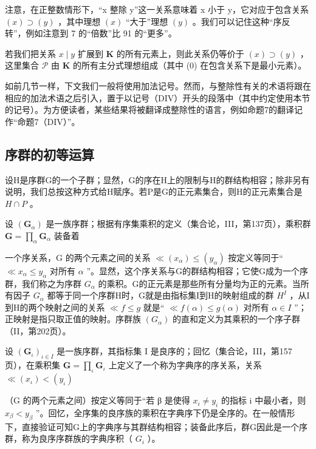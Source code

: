注意，在正整数情形下，“x 整除 y”这一关系意味着 x 小于 y，它对应于包含关系 \((x) \supset (y)\) ，其中理想 \((x)\) “大于”理想 \((y)\) 。我们可以记住这种“序反转”，例如注意到 7 的“倍数”比 91 的“更多”。

若我们把关系 \(x \mid y\) 扩展到 \(\mathbf{K}\) 的所有元素上，则此关系仍等价于 \((x) \supset (y)\) ，这里集合 \(\mathcal{P}\) 由 \(\mathbf{K}\) 的所有主分式理想组成（其中 (0) 在包含关系下是最小元素）。

如前几节一样，下文我们一般将使用加法记号。然而，与整除性有关的术语将跟在相应的加法术语之后引入，置于以记号（DIV）开头的段落中（其中约定使用本节的记号）。为方便读者，某些结果将被翻译成整除性的语言，例如命题7的翻译记作“命题7（DIV）”。

\subsection{序群的初等运算}

设H是序群G的一个子群；显然，G的序在H上的限制与H的群结构相容；除非另有说明，我们总按这种方式给H赋序。若P是G的正元素集合，则H的正元素集合是 \(H \cap P\) 。

设 \((\mathbf{G}_{\alpha})\) 是一族序群；根据有序集乘积的定义（集合论，III，第137页），乘积群 \(\mathbf{G} = \prod_{\alpha}\mathbf{G}_{\alpha}\) 装备着

一个序关系，G 的两个元素之间的关系 \(\ll (x_{\alpha}) \leqslant (y_{\alpha})\) 按定义等同于“ \(\ll x_{\alpha} \leqslant y_{\alpha}\) 对所有 \(\alpha\) ”。显然，这个序关系与G的群结构相容；它使G成为一个序群，我们称之为序群 \(G_{\alpha}\) 的乘积。G的正元素是那些所有分量均为正的元素。当所有因子 \(G_{\alpha}\) 都等于同一个序群H时，G就是由指标集I到H的映射组成的群 \(H^{I}\) ，从I到H的两个映射之间的关系 \(\ll f \leqslant g\) 就是“ \(\ll f(\alpha) \leqslant g(\alpha)\) 对所有 \(\alpha \in I\) ”；正映射是指只取正值的映射。序群族 \((G_{\alpha})\) 的直和定义为其乘积的一个序子群（II，第202页）。

设 \((\mathbf{G}_{\iota})_{\iota \in I}\) 是一族序群，其指标集 I 是良序的；回忆（集合论，III，第157页），在乘积集 \(\mathbf{G} = \prod_{\iota} \mathbf{G}_{\iota}\) 上定义了一个称为字典序的序关系，关系 \(\ll (x_{\iota}) < (y_{\iota})\)

（G 的两个元素之间）按定义等同于“若 β 是使得 \(x_{i} \neq y_{i}\) 的指标 i 中最小者，则 \(x_{\beta} < y_{\beta}\) ”。回忆，全序集的良序族的乘积在字典序下仍是全序的。在一般情形下，直接验证可知G上的字典序与其群结构相容；装备此序后，群G因此是一个序群，称为良序序群族的字典序积（ \(G_{i}\) ）。

